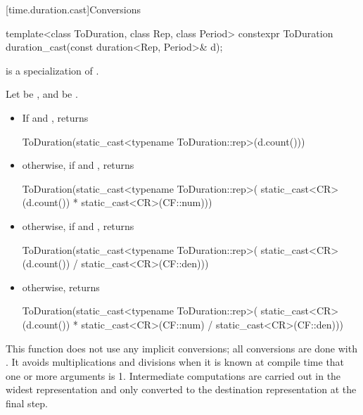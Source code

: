 [time.duration.cast]{Conversions}

%
%
\begin{itemdecl}
template<class ToDuration, class Rep, class Period>
  constexpr ToDuration duration_cast(const duration<Rep, Period>& d);
\end{itemdecl}

\begin{itemdescr}
\pnum
\constraints
{} is a specialization of .

\pnum
\returns
Let  be , and  be .
\begin{itemize}
\item If  and , returns
\begin{codeblock}
ToDuration(static_cast<typename ToDuration::rep>(d.count()))
\end{codeblock}

\item otherwise, if  and , returns
\begin{codeblock}
ToDuration(static_cast<typename ToDuration::rep>(
  static_cast<CR>(d.count()) * static_cast<CR>(CF::num)))
\end{codeblock}

\item otherwise, if  and , returns
\begin{codeblock}
ToDuration(static_cast<typename ToDuration::rep>(
  static_cast<CR>(d.count()) / static_cast<CR>(CF::den)))
\end{codeblock}

\item otherwise, returns
\begin{codeblock}
ToDuration(static_cast<typename ToDuration::rep>(
  static_cast<CR>(d.count()) * static_cast<CR>(CF::num) / static_cast<CR>(CF::den)))
\end{codeblock}
\end{itemize}

\pnum
\begin{note}
This function does not use any implicit conversions; all conversions
are done with . It avoids multiplications and divisions when
it is known at compile time that one or more arguments is 1. Intermediate
computations are carried out in the widest representation and only converted to
the destination representation at the final step.
\end{note}
\end{itemdescr}

